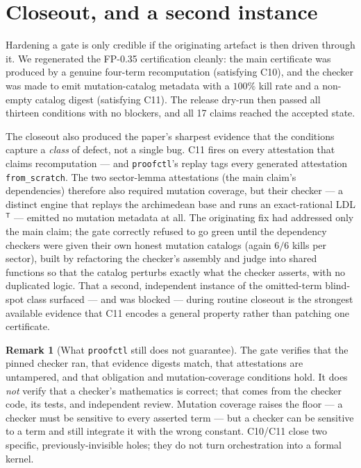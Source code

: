 \documentclass[11pt,a4paper]{amsart}
\theoremstyle{plain}
\theoremstyle{definition}
\newtheorem{remark}[theorem]{Remark}
\newcommand{\proofctl}{\texttt{proofctl}}
\newcommand{\CtenA}{\textsf{C10}}
\newcommand{\CelevenA}{\textsf{C11}}
\begin{document}
\section{Closeout, and a second instance}
\label{sec:closeout}

Hardening a gate is only credible if the originating artefact is then driven
through it. We regenerated the FP-0.35 certification cleanly: the main
certificate was produced by a genuine four-term recomputation (satisfying
\CtenA{}), and the checker was made to emit mutation-catalog metadata with a
$100\%$ kill rate and a non-empty catalog digest (satisfying \CelevenA{}). The
release dry-run then passed all thirteen conditions with no blockers, and all
17 claims reached the accepted state.

The closeout also produced the paper's sharpest evidence that the conditions
capture a \emph{class} of defect, not a single bug. \CelevenA{} fires on every
attestation that claims recomputation --- and \proofctl{}'s replay tags every
generated attestation \texttt{from\_scratch}. The two sector-lemma attestations
(the main claim's dependencies) therefore also required mutation coverage, but
their checker --- a distinct engine that replays the archimedean base and runs an
exact-rational LDL$^\mathsf{T}$ --- emitted no mutation metadata at all. The
originating fix had addressed only the main claim; the gate correctly refused to
go green until the dependency checkers were given their own honest mutation
catalogs (again $6/6$ kills per sector), built by refactoring the checker's
assembly and judge into shared functions so that the catalog perturbs exactly
what the checker asserts, with no duplicated logic. That a second, independent
instance of the omitted-term blind-spot class surfaced --- and was blocked ---
during routine closeout is the strongest available evidence that \CelevenA{}
encodes a general property rather than patching one certificate.

\begin{remark}[What \texorpdfstring{\protect\proofctl}{proofctl} still does not
guarantee]
The gate verifies that the pinned checker ran, that evidence digests match, that
attestations are untampered, and that obligation and mutation-coverage conditions
hold. It does \emph{not} verify that a checker's mathematics is correct; that
comes from the checker code, its tests, and independent review. Mutation coverage
raises the floor --- a checker must be sensitive to every asserted term --- but a
checker can be sensitive to a term and still integrate it with the wrong
constant. \CtenA{}/\CelevenA{} close two specific, previously-invisible holes;
they do not turn orchestration into a formal kernel.
\end{remark}
\end{document}
